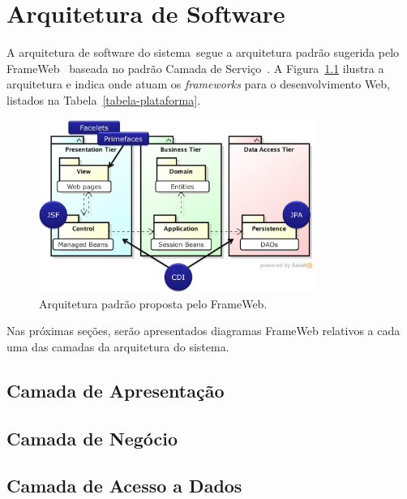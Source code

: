 
\chapter{Arquitetura de Software}
\label{sec-arquitetura}

A arquitetura de software do sistema~\imprimirtitulo segue a arquitetura padrão sugerida pelo FrameWeb~\cite{souza:masterthesis07,souza-et-al:iism09} baseada no padrão Camada de Serviço~\cite{fowler:book02}. A Figura~\ref{figura-arquitetura-padrao} ilustra a arquitetura e indica onde atuam os \textit{frameworks} para o desenvolvimento Web, listados na Tabela~\ref{tabela-plataforma}.

\begin{figure}[h]
	\centering
	\includegraphics[width=0.8\textwidth]{figuras/figura-arquitetura-padrao.png}
	\caption{Arquitetura padrão proposta pelo FrameWeb.}
	\label{figura-arquitetura-padrao}
\end{figure}

Nas próximas seções, serão apresentados diagramas FrameWeb relativos a cada uma das camadas da arquitetura do sistema.


\section{Camada de Apresentação}
\label{sec-arquitetura-apresentacao}





\section{Camada de Negócio}
\label{sec-arquitetura-negocio}





\section{Camada de Acesso a Dados}
\label{sec-arquitetura-dados}


